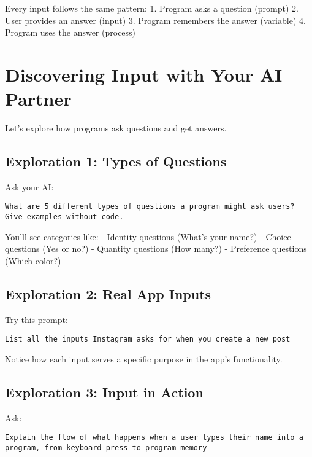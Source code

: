 \documentclass[
  letterpaper,
  DIV=11,
  numbers=noendperiod,
  oneside]{scrreprt}
\begin{document}
Every input follows the same pattern: 1. Program asks a question
(prompt) 2. User provides an answer (input) 3. Program remembers the
answer (variable) 4. Program uses the answer (process)

\section{Discovering Input with Your AI
Partner}\label{discovering-input-with-your-ai-partner}

Let's explore how programs ask questions and get answers.

\subsection{Exploration 1: Types of
Questions}\label{exploration-1-types-of-questions}

Ask your AI:

\begin{verbatim}
What are 5 different types of questions a program might ask users? Give examples without code.
\end{verbatim}

You'll see categories like: - Identity questions (What's your name?) -
Choice questions (Yes or no?) - Quantity questions (How many?) -
Preference questions (Which color?)

\subsection{Exploration 2: Real App
Inputs}\label{exploration-2-real-app-inputs}

Try this prompt:

\begin{verbatim}
List all the inputs Instagram asks for when you create a new post
\end{verbatim}

Notice how each input serves a specific purpose in the app's
functionality.

\subsection{Exploration 3: Input in
Action}\label{exploration-3-input-in-action}

Ask:

\begin{verbatim}
Explain the flow of what happens when a user types their name into a program, from keyboard press to program memory
\end{verbatim}
\end{document}
